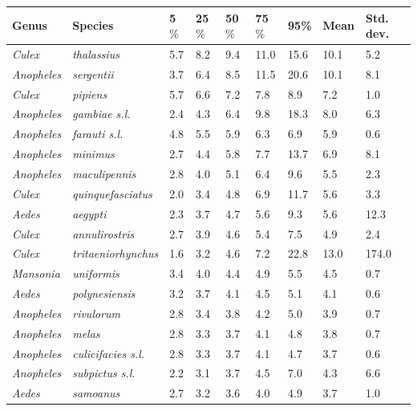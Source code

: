 \documentclass[12pt]{article}
\begin{document}
\begin{table}[htbp!]
	\begin{tabular}{l|l|l|l|l|l|l|l|l}
		\textbf{Genus} & \textbf{Species} & \textbf{5$\%$} & \textbf{25$\%$} & \textbf{50$\%$} & \textbf{75$\%$} & \textbf{95\%} &  \textbf{Mean} & \textbf{Std. dev.}\\
		\hline
	\textit{Culex} & \textit{thalassius} & 5.7 & 8.2 & 9.4 & 11.0 & 15.6 & 10.1 & 5.2 \\
	\textit{Anopheles} & \textit{sergentii} & 3.7 & 6.4 & 8.5 & 11.5 & 20.6 & 10.1 & 8.1 \\
	\textit{Culex} & \textit{pipiens} & 5.7 & 6.6 & 7.2 & 7.8 & 8.9 & 7.2 & 1.0 \\
	\textit{Anopheles} & \textit{gambiae s.l.} & 2.4 & 4.3 & 6.4 & 9.8 & 18.3 & 8.0 & 6.3 \\
	\textit{Anopheles} & \textit{farauti s.l.} & 4.8 & 5.5 & 5.9 & 6.3 & 6.9 & 5.9 & 0.6 \\
	\textit{Anopheles} & \textit{minimus} & 2.7 & 4.4 & 5.8 & 7.7 & 13.7 & 6.9 & 8.1 \\
	\textit{Anopheles} & \textit{maculipennis} & 2.8 & 4.0 & 5.1 & 6.4 & 9.6 & 5.5 & 2.3 \\
	\textit{Culex} & \textit{quinquefasciatus} & 2.0 & 3.4 & 4.8 & 6.9 & 11.7 & 5.6 & 3.3 \\
	\textit{Aedes} & \textit{aegypti} & 2.3 & 3.7 & 4.7 & 5.6 & 9.3 & 5.6 & 12.3 \\
	\textit{Culex} & \textit{annulirostris} & 2.7 & 3.9 & 4.6 & 5.4 & 7.5 & 4.9 & 2.4 \\
	\textit{Culex} & \textit{tritaeniorhynchus} & 1.6 & 3.2 & 4.6 & 7.2 & 22.8 & 13.0 & 174.0 \\
	\textit{Mansonia} & \textit{uniformis} & 3.4 & 4.0 & 4.4 & 4.9 & 5.5 & 4.5 & 0.7 \\
	\textit{Aedes} & \textit{polynesiensis} & 3.2 & 3.7 & 4.1 & 4.5 & 5.1 & 4.1 & 0.6 \\
	\textit{Anopheles} & \textit{rivulorum} & 2.8 & 3.4 & 3.8 & 4.2 & 5.0 & 3.9 & 0.7 \\
	\textit{Anopheles} & \textit{melas} & 2.8 & 3.3 & 3.7 & 4.1 & 4.8 & 3.8 & 0.7 \\
	\textit{Anopheles} & \textit{culicifacies s.l.} & 2.8 & 3.3 & 3.7 & 4.1 & 4.7 & 3.7 & 0.6 \\
	\textit{Anopheles} & \textit{subpictus s.l.} & 2.2 & 3.1 & 3.7 & 4.5 & 7.0 & 4.3 & 6.6 \\
	\textit{Aedes} & \textit{samoanus} & 2.7 & 3.2 & 3.6 & 4.0 & 4.9 & 3.7 & 1.0 \\

\end{tabular}
\end{table}
\end{document}
